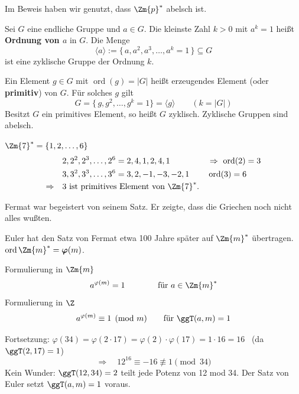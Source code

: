 Im Beweis haben wir genutzt, dass $\Zm{p}^*$ abelsch ist.

\begin{definition}[Bezeichnung]
Sei $G$ eine endliche Gruppe und $a \in G$. Die kleinste Zahl $k > 0$ mit $a^k = 1$ heißt \textbf{Ordnung von $a$} in $G$. Die Menge
\[
  \langle a \rangle := \{\, a, a^2, a^3, \ldots, a^k = 1 \,\} \subseteq G
\]
ist eine zyklische Gruppe der Ordnung $k$.

Ein Element $g \in G$ mit $\operatorname{ord}(g) = |G|$ heißt erzeugendes Element (oder \textbf{primitiv}) von $G$. Für solches $g$ gilt
\[
  G = \{\, g, g^2, \ldots, g^k = 1 \} = \langle g \rangle \qquad (k = |G|)
\]
Besitzt $G$ ein primitives Element, so heißt $G$ zyklisch. Zyklische Gruppen sind abelsch.
\end{definition}

\begin{beispiel}
$\Zm{7}^* = \{1, 2, \ldots, 6\}$
\begin{align*}
  & 2, 2^2, 2^3, \ldots, 2^6 = 2, 4, 1, 2, 4, 1 && \Rightarrow\ \operatorname{ord}(2) = 3 \\
  & 3, 3^2, 3^3, \ldots, 3^6 = 3, 2, -1, -3, -2, 1 && \operatorname{ord}(3) = 6 \\
  \Rightarrow\quad & 3 \text{ ist primitives Element von } \Zm{7}^*.
\end{align*}
\end{beispiel}

\begin{bemerkung}
Fermat war begeistert von seinem Satz. %
Er zeigte, dass die Griechen noch nicht alles wußten.

Euler hat den Satz von Fermat etwa 100 Jahre später auf $\Zm{m}^*$ übertragen.\\
$\operatorname{ord} \Zm{m}^* = \boldsymbol{\varphi}(m)$.
\end{bemerkung}

\begin{satz}[Euler]
Formulierung in $\Zm{m}$
\[
  a^{\varphi(m)} = 1 \qquad\qquad \text{für } a \in \Zm{m}^*
\]
Formulierung in $\Z$
\[
  a^{\varphi(m)} \equiv 1 \pmod{m} \qquad \text{für } \ggT(a, m) = 1
\]
\end{satz}

\begin{beispiel}
Fortsetzung: $\varphi(34) = \varphi(2 \cdot 17) = \varphi(2) \cdot \varphi(17) = 1 \cdot 16 = 16$ \ (da $\ggT(2, 17) = 1$)
\[
  \Rightarrow \quad 12^{16} \equiv -16 \not\equiv 1 \pmod{34}
\]
Kein Wunder: $\ggT(12, 34) = 2$ teilt jede Potenz von 12 mod 34. Der Satz von Euler setzt $\ggT(a, m) = 1$ voraus.
\end{beispiel}

